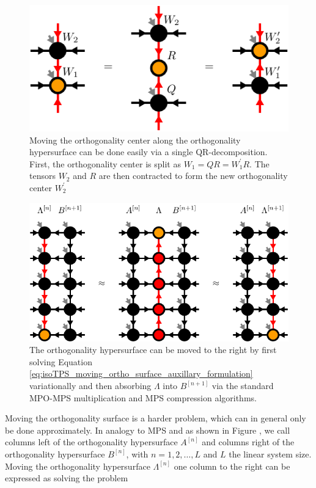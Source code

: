 \begin{figure}
	\centering
	\includegraphics[scale=1]{figures/tikz/Tensor_Networks/isoTPS_moving_ortho_center/isoTPS_moving_ortho_center.pdf}
	\caption{Moving the orthogonality center along the orthogonality hypersurface can be done easily via a single QR-decomposition. First, the orthogonality center is split as $W_1 = QR = W_1^\prime R$. The tensors $W_2$ and $R$ are then contracted to form the new orthogonality center $W_2^\prime$}
	\label{fig:isoTPS_moving_ortho_center}
\end{figure}
\begin{figure}
	\centering
	\includegraphics[scale=1]{figures/tikz/Tensor_Networks/isoTPS_moving_ortho_surface/isoTPS_moving_ortho_surface.pdf}
	\caption{The orthogonality hypersurface can be moved to the right by first solving Equation \eqref{eq:isoTPS_moving_ortho_surface_auxillary_formulation} variationally and then absorbing $\Lambda$ into $B^{[n+1]}$ via the standard MPO-MPS multiplication and MPS compression algorithms.}
	\label{fig:isoTPS_moving_ortho_column}
\end{figure}
Moving the orthogonality surface is a harder problem, which can in general only be done approximately. In analogy to MPS and as shown in Figure , we call columns left of the orthogonality hypersurface $A^{[n]}$ and columns right of the orthogonality hypersurface $B^{[n]}$, with $n = 1,2,\dots,L$ and $L$ the linear system size. Moving the orthogonality hypersurface $\Lambda^{[n]}$ one column to the right can be expressed as solving the problem
